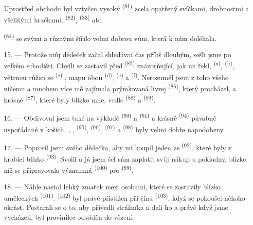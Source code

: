 Uprostřed obchodu byl vztyčen vysoký 
\textsuperscript{(81)} zcela opatřený svíčkami, drobnostmi a všelikými hračkami:
 \textsuperscript{(82)}, 
\textsuperscript{(83)} atd.

 \textsuperscript{(84)} se svými  a
různými  šířilo velmi dobrou vůni, která k nám doléhala.

\VUsaut{3.4mm}
\VUsaut{2.8mm}

15. --- Protože můj dědeček začal shledávat čas příliš dlouhým, sešli jsme po velkém
schodišti. Chvíli se zastavil před 
\textsuperscript{(85)} znázorňující, jak mi řekl, 
\textsuperscript{(a)},  \textsuperscript{(b)},
větrnou růžici se  \textsuperscript{(c)}
, mapu obou 
\textsuperscript{(d)},  \textsuperscript{(e)} a  \textsuperscript{(f)}. Nerozuměl jsem z toho všeho ničemu a mnohem více mě
zajímala prýmkovaná livrej  \textsuperscript{(86)}, který procházel, a
krásné  \textsuperscript{(87)}, které byly blízko mne, vedle
 \textsuperscript{(88)} a 
\textsuperscript{(89)}.

16. --- Obdivoval jsem také na výkladě  \textsuperscript{(90)} a
 \textsuperscript{(91)} a krásné 
\textsuperscript{(94)} půvabně uspořádané v koších. , ,
 \textsuperscript{(95)},  \textsuperscript{(96)},
 \textsuperscript{(97)} a 
\textsuperscript{(98)} byly velmi dobře napodobeny.

\VUsaut{4.4mm}
\VUsaut{2.8mm}

17. --- Poprosil jsem svého dědečka, aby mi koupil jeden ze 
\textsuperscript{(92)}, které byly v krabici blízko 
\textsuperscript{(93)}. Svolil a já jsem šel sám zaplatit svůj nákup u pokladny, blízko
níž se připravovala významná  \textsuperscript{(100)} pro
 \textsuperscript{(99)}.

18. --- Náhle nastal lehký zmatek mezi osobami, které se zastavily blízko uměleckých
 \textsuperscript{(101)}.  \textsuperscript{(102)} byl
právě přistižen při činu  \textsuperscript{(103)}, když se pokoušel
někoho okrást. Postarali se o to, aby přivedli strážníka a dali ho  a
právě když jsme vycházeli, byl provinilec odváděn do vězení.

